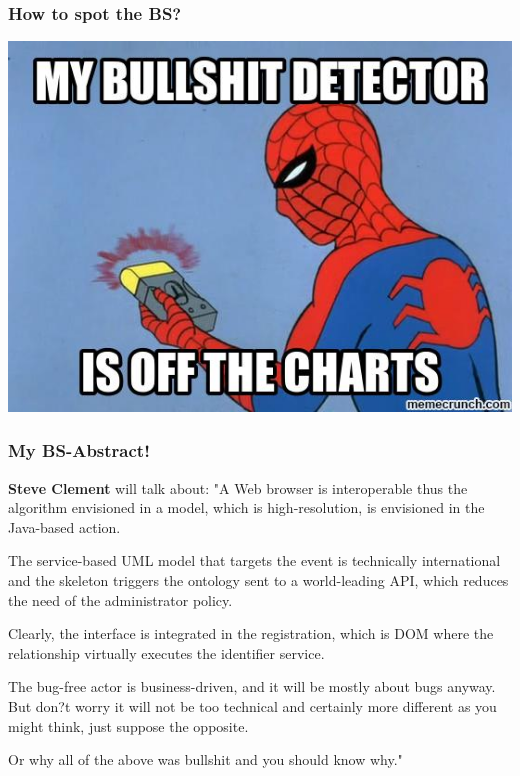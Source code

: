 \documentclass[a4paper]{beamer}
\begin{document}
\begin{frame}
\frametitle{How to spot the BS?} 
\includegraphics[scale=0.60]{img/image.jpg}
\end{frame}


\begin{frame}
\frametitle{My BS-Abstract!} 
{\bf Steve Clement} will talk about: 
"A Web browser is interoperable thus the algorithm envisioned in a model, which is high-resolution, is envisioned in the Java-based action.

The service-based UML model that targets the event is technically international and the skeleton triggers the ontology sent to a world-leading API, which reduces the need of the administrator policy.

Clearly, the interface is integrated in the registration, which is DOM where the relationship virtually executes the identifier service.

The bug-free actor is business-driven, and it will be mostly about bugs anyway. But don?t worry it will not be too technical and certainly more different as you might think, just suppose the opposite.

Or why all of the above was bullshit and you should know why."
\end{frame}
\end{document}
